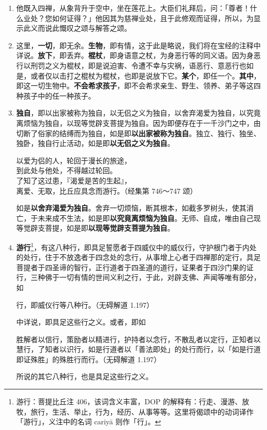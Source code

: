 \begin{enumerate}
\item 他既入四禅，从象背升于空中，坐在莲花上。大臣们礼拜后，问：「尊者！什么业处？您如何证得？」他因其为慈禅业处，且于此修观而证得，所以，为显示此义而说此慨叹之颂与解答之颂。
\item 这里，\textbf{一切}，即无余。\textbf{生物}，即有情，这于此是略说，我们将在宝经的注释中详说。\textbf{放下}，即丢弃。\textbf{棍杖}，即身语意之杖，为身恶行等的同义语。因为身恶行以刑罚之义为棍杖，即是说迫害、令遭不幸与灾祸，语恶行、意恶行也如是，或者仅以击打之棍杖为棍杖，也即是说放下它。\textbf{某个}，即任一个。\textbf{其中}，即这一切生物中。\textbf{不会希求孩子}，即不会希求亲生、野生、领养、弟子等这四种孩子中的任一种孩子。
\item \textbf{独自}，即以出家被称为独自，以无侣之义为独自，以舍弃渴爱为独自，以究竟离烦恼为独自，以现等觉辟支菩提为独自。因为即便存在于一千沙门之中，由切断了俗家的结缚而为独自，如是即\textbf{以出家被称为独自}。独立、独行、独坐、独卧，独自行止活动，如是即\textbf{以无侣之义为独自}。\begin{quoting}以爱为侣的人，轮回于漫长的旅途，\\到此处与他处，不得越过轮回。\\了知了这过患，『渴爱是苦的生起』，\\离爱、无取，比丘应具念而游行。（经集第 746～747 颂）\end{quoting}如是\textbf{以舍弃渴爱为独自}。舍弃一切烦恼，断其根本，如截多罗树头，使其消亡，于未来成不生法，如是即\textbf{以究竟离烦恼为独自}。无师、自成，唯由自己现等觉辟支菩提，如是即\textbf{以现等觉辟支菩提为独自}。
\item \textbf{游行}\footnote{游行：菩提比丘注 406，该词含义丰富，DOP 的解释有：行走、漫游、放牧，旅行，生活、举止，行为，经历、从事等等。这里将偈颂中的动词译作「游行」，义注中的名词 cariyā 则作「行」。}，有这八种行，即具足誓愿者于四威仪中的威仪行，守护根门者于内处的处行，住于不放逸者于四念处的念行，从事增上心者于四禅那的定行，具足菩提者于四圣谛的智行，正行道者于四圣道的道行，证果者于四沙门果的证行，三种佛于一切有情的世间义利之行，于此，对辟支佛、声闻等唯有部分，如\begin{quoting}行，即威仪行等八种行。（无碍解道 1.197）\end{quoting}中详说，即具足这些行之义。或者，即如\begin{quoting}胜解者以信行，策励者以精进行，护持者以念行，不散乱者以定行，正知者以慧行，了知者以识行，如是行道者以「善法即处」的处行而行，以「如是行道即证殊胜」的殊胜行而行。（无碍解道 1.197）\end{quoting}所说的其它八种行，也是具足这些行之义。

\end{enumerate}
